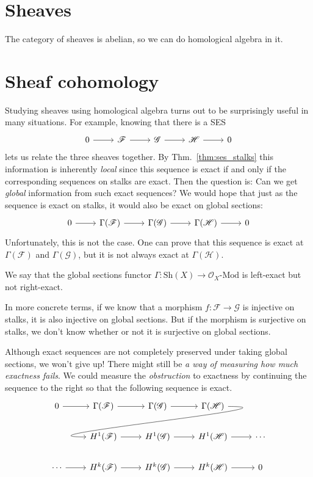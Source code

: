 \documentclass[12pt]{article}
\begin{document}
\section{Sheaves}
The category of sheaves is abelian, so we can do homological
algebra in it.

\section{Sheaf cohomology}
Studying sheaves using homological algebra turns out to be surprisingly
useful in many situations. For example, knowing that there is a SES
\[
  \begin{tikzcd}
    0 \arrow{r} & \mathcal{F} \arrow{r} & \mathcal{G} \arrow{r} &
    \mathcal{H} \arrow{r} & 0
  \end{tikzcd}
\]
lets us relate the three sheaves together. By Thm.~\ref{thm:ses_stalks}
this information is inherently \emph{local} since this sequence is exact
if and only if the corresponding sequences on stalks are exact.
Then the question is: Can we get \emph{global} information from
such exact sequences? We would hope that just as the sequence is exact
on stalks, it would also be exact on global sections:
\[
  \begin{tikzcd}
    0 \arrow{r} & \Gamma(\mathcal{F}) \arrow{r} & \Gamma(\mathcal{G})
    \arrow{r} & \Gamma(\mathcal{H}) \arrow{r} & 0
  \end{tikzcd}
\]
Unfortunately, this is not the case. One can prove that this sequence
is exact at $\Gamma(\mathcal{F})$ and $\Gamma(\mathcal{G})$, but it
is not always exact at $\Gamma(\mathcal{H})$.
\begin{cat}
  We say that the global sections functor $\Gamma: \text{Sh}(X)\to \mathcal{O}_{X}\text{-Mod}$ is left-exact but not right-exact.
\end{cat}
In more concrete terms, if we know that a morphism $f: \mathcal{F}
\to\mathcal{G}$ is injective on stalks, it is also injective on
global sections. But if the morphism is surjective on stalks, we don't
know whether or not it is surjective on global sections.

Although exact sequences are not completely preserved under taking
global sections, we won't give up! There might still be \emph{a way of
measuring how much exactness fails}. We could measure the
\emph{obstruction} to exactness by continuing the sequence to the right
so that the following sequence is exact.
\[
  \begin{tikzcd}
    0 \arrow{r} & \Gamma(\mathcal{F}) \arrow{r} & \Gamma(\mathcal{G})
    \arrow{r} & \Gamma(\mathcal{H})
    \arrow[out=0, in=180, looseness=1.5, overlay]{dll} & \\
     & H^{1}(\mathcal{F}) \arrow{r} & H^{1}(\mathcal{G})
    \arrow{r} & H^{1}(\mathcal{H}) \arrow{r} & \cdots \\
    \cdots \arrow{r}& H^{k}(\mathcal{F}) \arrow{r} & H^{k}(\mathcal{G})
    \arrow{r} & H^{k}(\mathcal{H}) \arrow{r} & 0
  \end{tikzcd}
\]
\end{document}

